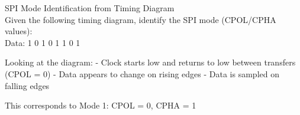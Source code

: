 \begin{example2}{SPI Mode Identification from Timing Diagram}\\
Given the following timing diagram, identify the SPI mode (CPOL/CPHA values):
\\
Data:  1     0     1     0     1     1     0     1

\tcblower
Looking at the diagram:
- Clock starts low and returns to low between transfers (CPOL = 0)
- Data appears to change on rising edges
- Data is sampled on falling edges

This corresponds to Mode 1: CPOL = 0, CPHA = 1
\end{example2}




    